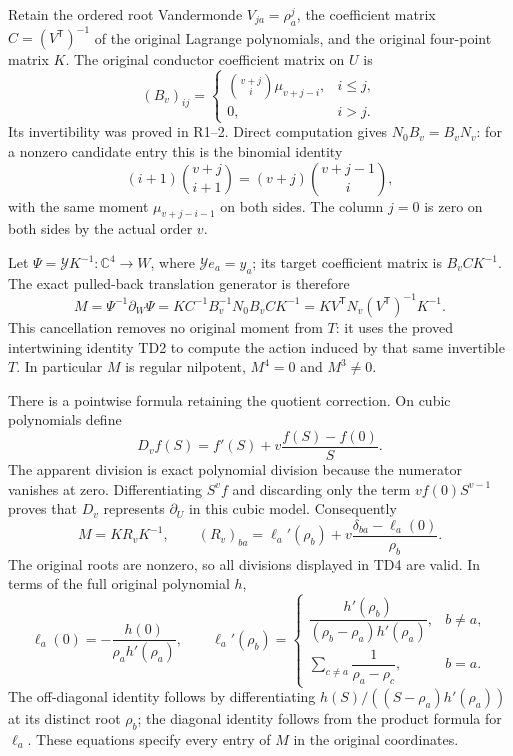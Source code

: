 \documentclass[11pt]{article}
\newcommand{\C}{\mathbb C}
\begin{document}
Retain the ordered root Vandermonde $V_{ja}=\rho_a^j$, the
coefficient matrix $C=(V^{\mathsf T})^{-1}$ of the original
Lagrange polynomials, and the original four-point matrix $K$.
The original conductor coefficient matrix on $U$ is
\[
 (B_v)_{ij}=\begin{cases}\binom{v+j}{i}\mu_{v+j-i},&i\le j,\\
 0,&i>j.\end{cases}
\]
Its invertibility was proved in R1--2. Direct computation gives
$N_0B_v=B_vN_v$: for a nonzero candidate entry this is the binomial
identity
\[
 (i+1)\binom{v+j}{i+1}=(v+j)\binom{v+j-1}{i},
\]
with the same moment $\mu_{v+j-i-1}$ on both sides. The column
$j=0$ is zero on both sides by the actual order $v$.

Let $\Psi=\mathcal YK^{-1}:\C^4\to W$, where
$\mathcal Ye_a=y_a$; its target coefficient matrix is $B_vCK^{-1}$.
The exact pulled-back translation generator is therefore
\begin{equation}
 M=\Psi^{-1}\partial_W\Psi
   =K C^{-1}B_v^{-1}N_0B_v C K^{-1}
   =K V^{\mathsf T}N_v(V^{\mathsf T})^{-1}K^{-1}.
 \tag{TD3}
\end{equation}
This cancellation removes no original moment from $T$: it uses the
proved intertwining identity TD2 to compute the action induced by
that same invertible $T$. In particular $M$ is regular nilpotent,
$M^4=0$ and $M^3\ne0$.

There is a pointwise formula retaining the quotient correction.
On cubic polynomials define
\[
 D_vf(S)=f'(S)+v\frac{f(S)-f(0)}{S}.
\]
The apparent division is exact polynomial division because the
numerator vanishes at zero. Differentiating $S^vf$ and discarding
only the term $vf(0)S^{v-1}$ proves that $D_v$ represents
$\partial_U$ in this cubic model. Consequently
\begin{equation}
 M=KR_vK^{-1},\qquad
 (R_v)_{ba}=\ell_a'(\rho_b)
        +v\frac{\delta_{ba}-\ell_a(0)}{\rho_b}.\tag{TD4}
\end{equation}
The original roots are nonzero, so all divisions displayed in TD4
are valid. In terms of the full original polynomial $h$,
\[
 \ell_a(0)=-\frac{h(0)}{\rho_a h'(\rho_a)},\qquad
 \ell_a'(\rho_b)=\begin{cases}
 \dfrac{h'(\rho_b)}{(\rho_b-\rho_a)h'(\rho_a)},&b\ne a,\\[6pt]
 \displaystyle\sum_{c\ne a}\dfrac1{\rho_a-\rho_c},&b=a.
 \end{cases}
\]
The off-diagonal identity follows by differentiating
$h(S)/((S-\rho_a)h'(\rho_a))$ at its distinct root $\rho_b$;
the diagonal identity follows from the product formula for
$\ell_a$. These equations specify every entry of $M$ in the
original coordinates.
\end{document}
